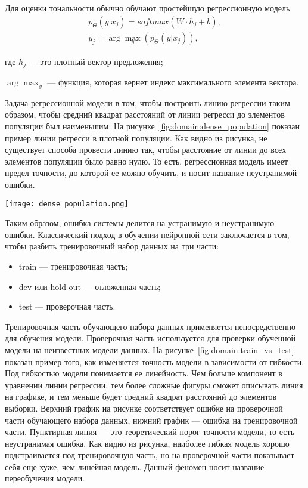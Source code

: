 Для оценки тональности обычно обучают простейшую регрессионную модель
\begin{gather}
  p_{\Theta}(y|x_j) = softmax(W\cdot{h_j} + b),\\
  y_j = \arg \max_y(p_{\Theta}(y|x_j)),
\end{gather}
\begin{explanationx}
\item[где] $h_j$ --- это плотный вектор предложения;
\item$\arg \max_y$ --- функция, которая вернет индекс максимального элемента вектора.
\end{explanationx}

Задача регрессионной модели в том, чтобы построить линию регрессии таким образом, чтобы средний квадрат расстояний от линии регресси до элементов популяции был наименьшим. На рисунке~\ref{fig:domain:dense_population} показан пример линии регресси в плотной популяции. Как видно из рисунка, не существует способа провести линию так, чтобы расстояние от линии до всех элементов популяции было равно нулю. То есть, регрессионная модель имеет предел точности, до которой ее можно обучить, и носит название неустранимой ошибки.

\begin{center}
  \texttt{[image: dense\_population.png]}
  \label{fig:domain:dense_population}
\end{center}

Таким образом, ошибка системы делится на устранимую и неустранимую ошибки. Классический подход в обучении нейронной сети заключается в том, чтобы разбить тренировочный набор данных на три части:
\begin{itemize}
\item train --- тренировочная часть;
\item dev или hold out --- отложенная часть;
\item test --- проверочная часть.
\end{itemize}

Тренировочная часть обучающего набора данных применяется непосредственно для обучения модели. Проверочная часть используется для проверки обученной модели на неизвестных модели данных. На рисунке~\ref{fig:domain:train_vs_test} показан пример того, как изменяется точность модели в зависимости от гибкости. Под гибкостью модели понимается ее линейность. Чем больше компонент в уравнении линии регрессии, тем более сложные фигуры сможет описывать линия на графике, и тем меньше будет средний квадрат расстояний до элементов выборки. Верхний график на рисунке соответствует ошибке на проверочной части обучающего набора данных, нижний график --- ошибка на тренировочной части. Пунктирная линия --- это теоретический порог точности модели, то есть неустранимая ошибка. Как видно из рисунка, наиболее гибкая модель хорошо подстраивается под тренировочную часть, но на проверочной части показывает себя еще хуже, чем линейная модель. Данный феномен носит название переобучения модели.

